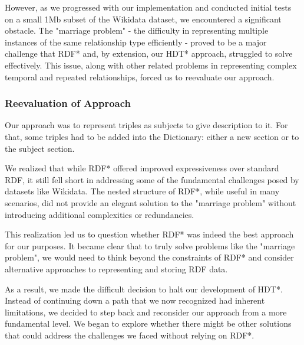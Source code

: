 However, as we progressed with our implementation and conducted initial tests on a small 1Mb subset of the Wikidata dataset, we encountered a significant obstacle. The "marriage problem" - the difficulty in representing multiple instances of the same relationship type efficiently - proved to be a major challenge that RDF* and, by extension, our HDT* approach, struggled to solve effectively. This issue, along with other related problems in representing complex temporal and repeated relationships, forced us to reevaluate our approach.


\subsubsection{Reevaluation of Approach}

Our approach was to represent triples as subjects to give description to it. For that, some triples had to be added into the Dictionary: either a new section or to the subject section. 

We realized that while RDF* offered improved expressiveness over standard RDF, it still fell short in addressing some of the fundamental challenges posed by datasets like Wikidata. The nested structure of RDF*, while useful in many scenarios, did not provide an elegant solution to the "marriage problem" without introducing additional complexities or redundancies.

This realization led us to question whether RDF* was indeed the best approach for our purposes. It became clear that to truly solve problems like the "marriage problem", we would need to think beyond the constraints of RDF* and consider alternative approaches to representing and storing RDF data.

As a result, we made the difficult decision to halt our development of HDT*. Instead of continuing down a path that we now recognized had inherent limitations, we decided to step back and reconsider our approach from a more fundamental level. We began to explore whether there might be other solutions that could address the challenges we faced without relying on RDF*.


